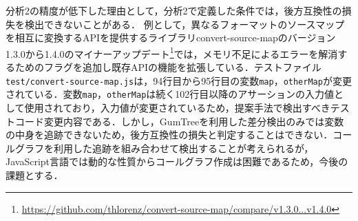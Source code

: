 \documentclass[submit]{ipsj}
\begin{document}
{%

分析2の精度が低下した理由として，分析2で定義した条件では，後方互換性の損失を検出できないことがある．
例として，異なるフォーマットのソースマップを相互に変換するAPIを提供するライブラリconvert-source-mapのバージョン1.3.0から1.4.0のマイナーアップデート\footnote{\url{https://github.com/thlorenz/convert-source-map/compare/v1.3.0...v1.4.0}}では，メモリ不足によるエラーを解消するためのフラグを追加し既存APIの機能を拡張している．テストファイル\verb|test/convert-source-map.js|は，94行目から95行目の変数{\verb|map|}，{\verb|otherMap|}が変更されている．変数{\verb|map|}，{\verb|otherMap|}は続く102行目以降のアサーションの入力値として使用されており，入力値が変更されているため，提案手法で検出すべきテストコード変更内容である．しかし，GumTreeを利用した差分検出のみでは変数の中身を追跡できないため，後方互換性の損失と判定することはできない．コールグラフを利用した追跡を組み合わせて検出することが考えられるが，JavaScript言語では動的な性質からコールグラフ作成は困難であるため\cite{js-call-graph}，今後の課題とする．


}
\end{document}
